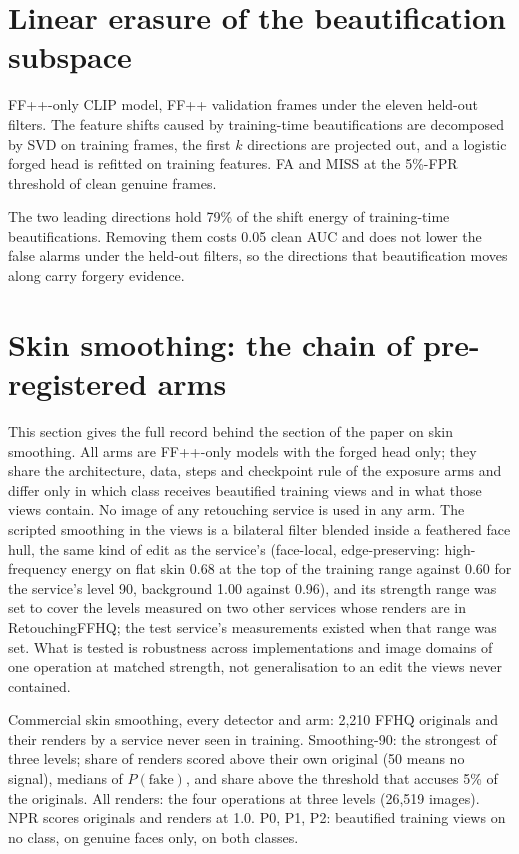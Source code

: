 \documentclass[10pt]{article}
\begin{document}
\section{Linear erasure of the beautification subspace}
\begin{table}[H]
\centering
\caption{FF++-only CLIP model, FF++ validation frames under the eleven held-out filters. The feature shifts caused by
training-time beautifications are decomposed by SVD on training frames, the first $k$ directions are projected out, and a
logistic forged head is refitted on training features. FA and MISS at the 5\%-FPR threshold of clean genuine frames.}
\label{tab:erasure}
\footnotesize

\end{table}
The two leading directions hold 79\% of the shift energy of training-time beautifications. Removing them costs 0.05
clean AUC and does not lower the false alarms under the held-out filters, so the directions that beautification moves
along carry forgery evidence.


\section{Skin smoothing: the chain of pre-registered arms}
\label{sec:chain}
This section gives the full record behind the section of the paper on skin smoothing. All arms are FF++-only models
with the forged head only; they share the architecture, data, steps and checkpoint rule of the exposure arms and differ
only in which class receives beautified training views and in what those views contain. No image of any retouching
service is used in any arm. The scripted smoothing in the views is a bilateral filter blended inside a feathered face
hull, the same kind of edit as the service's (face-local, edge-preserving: high-frequency energy on flat skin 0.68 at
the top of the training range against 0.60 for the service's level 90, background 1.00 against 0.96), and its strength
range was set to cover the levels measured on two other services whose renders are in RetouchingFFHQ; the test
service's measurements existed when that range was set. What is tested is robustness across implementations and image
domains of one operation at matched strength, not generalisation to an edit the views never contained.

\begin{table}[H]
\centering
\caption{Commercial skin smoothing, every detector and arm: 2,210 FFHQ originals and their renders by a service never
seen in training. Smoothing-90: the strongest of three levels; share of renders scored above their own original (50
means no signal), medians of $P(\text{fake})$, and share above the threshold that accuses 5\% of the originals. All
renders: the four operations at three levels (26,519 images). NPR scores originals and renders at 1.0. P0, P1, P2:
beautified training views on no class, on genuine faces only, on both classes.}
\label{tab:v4retouch}
\scriptsize
\begin{adjustbox}{max width=\linewidth}\end{adjustbox}
\end{table}
\end{document}
